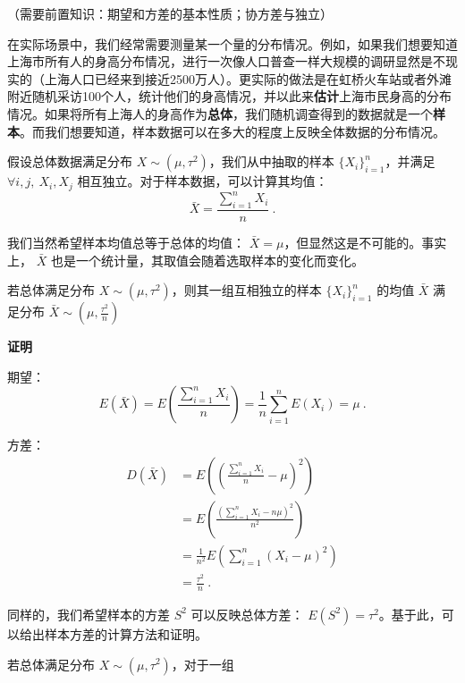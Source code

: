 
\begin{issues}
\issueDraft
\issueMissDepend
\end{issues}
（需要前置知识：期望和方差的基本性质；协方差与独立）

在实际场景中，我们经常需要测量某一个量的分布情况。例如，如果我们想要知道上海市所有人的身高分布情况，进行一次像人口普查一样大规模的调研显然是不现实的（上海人口已经来到接近2500万人）。更实际的做法是在虹桥火车站或者外滩附近随机采访100个人，统计他们的身高情况，并以此来\textbf{估计}上海市民身高的分布情况。如果将所有上海人的身高作为\textbf{总体}，我们随机调查得到的数据就是一个\textbf{样本}。而我们想要知道，样本数据可以在多大的程度上反映全体数据的分布情况。

假设总体数据满足分布 $X\sim(\mu, \tau^2)$，我们从中抽取的样本 $\{X_i \}_{i=1}^n$，并满足 $\forall i,j,\ X_i,X_j$ 相互独立。对于样本数据，可以计算其均值：\begin{equation}
\bar X=\frac{\sum_{i=1}^n X_i}{n}~.
\end{equation}

我们当然希望样本均值总等于总体的均值： $\bar X=\mu$，但显然这是不可能的。事实上， $\bar X$ 也是一个统计量，其取值会随着选取样本的变化而变化。

\begin{theorem}{}
若总体满足分布 $X\sim (\mu, \tau^2)$，则其一组互相独立的样本 $\{X_i \}_{i=1}^n$ 的均值 $\bar X$ 满足分布 $\bar X\sim (\mu, \frac{\tau^2}{n})$
\end{theorem}
\textbf{证明}

期望：
\begin{equation}
E(\bar X) =E(\frac{\sum_{i=1}^n X_i}{n}) 
        =\frac 1 n \sum_{i=1}^n E(X_i)=\mu~.
\end{equation}

方差：
\begin{equation}
\begin{aligned}
D(\bar X) &=E((\frac{\sum_{i=1}^n X_i}{n}-\mu)^2)\\
&= E(\frac{(\sum_{i=1}^n X_i-n \mu)^2}{n^2}) \\
&=\frac {1} {n^2} E(\sum_{i=1}^n (X_i-\mu)^2) \\
&=\frac {\tau^2}{n}~.
\end{aligned}
\end{equation}

同样的，我们希望样本的方差 $S^2$ 可以反映总体方差： $E(S^2)=\tau^2$。基于此，可以给出样本方差的计算方法和证明。
\begin{theorem}{}
若总体满足分布 $X\sim (\mu, \tau^2)$，对于一组
\end{theorem}
